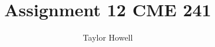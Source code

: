 \documentclass[12pt]{article}
\title{Assignment 12 CME 241}
\author{Taylor Howell}
\begin{document}
\maketitle

\newpage
\section{}
\clearpage
\end{document}
